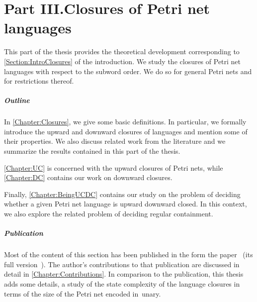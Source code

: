 \documentclass[../../diss.tex]{subfiles}
\begin{document}
\chapter*{Part III.\newline Closures of Petri net languages}

This part of the thesis provides the theoretical development corresponding to \cref{Section:IntroClosures} of the introduction.
We study the closures of Petri net languages with respect to the subword order.
We do so for general Petri nets and for restrictions thereof.

\paragraph{Outline}

In \cref{Chapter:Closures}, we give some basic definitions.
In particular, we formally introduce the upward and downward closures of languages and mention some of their properties.
We also discuss related work from the literature and we summarize the results contained in this part of the thesis.

\cref{Chapter:UC} is concerned with the upward closures of Petri nets, while \cref{Chapter:DC} contains our work on downward closures.

Finally, \cref{Chapter:BeingUCDC} contains our study on the problem of deciding whether a given Petri net language is upward \resp downward closed.
In this context, we also explore the related problem of deciding regular containment.

\paragraph{Publication}

Most of the content of this section has been published in the form the paper~\cite{AtigMMS17} (\resp its full version~\cite{AtigMMS17a}).
The author's contributions to that publication are discussed in detail in \cref{Chapter:Contributions}.
In comparison to the publication, this thesis adds some details, \eg a study of the state complexity of the language closures in terms of the size of the Petri net encoded in~unary.
\end{document}
